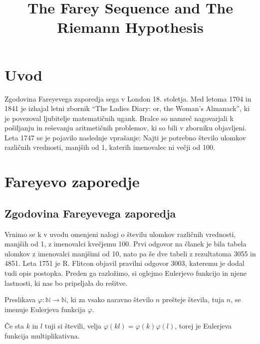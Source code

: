 \documentclass[mat1]{fmfdelo}
\title{The Farey Sequence and The Riemann Hypothesis}
\begin{document}
\section{Uvod}
Zgodovina Fareyevega zaporedja sega v London 18. stoletja. Med letoma 1704 in 1841 je izhajal letni zbornik ``The Ladies Diary: or, the Woman's Almanack'', ki je povezoval ljubitelje matematičnih ugank. Bralce so namreč nagovarjali k pošiljanju in reševanju aritmetičnih problemov, ki so bili v zborniku objavljeni. Leta 1747 se je pojavilo naslednje vprašanje: Najti je potrebno število ulomkov različnih vrednosti, manjših od 1, katerih imenovalec ni večji od 100.


\section{Fareyevo zaporedje}

\subsection{Zgodovina Fareyevega zaporedja}

Vrnimo se k v uvodu omenjeni nalogi o številu ulomkov različnih vrednosti, manjših od 1, z imenovalci kvečjemu 100. Prvi odgovor na članek je bila tabela ulomkov z imenovalci manjšimi od 10, nato pa še dve tabeli z rezultatoma 3055 in 4851. Leta 1751 je R. Flitcon objavil pravilni odgovor 3003, kateremu je dodal tudi opis postopka. Preden ga razložimo, si oglejmo Eulerjevo funkcijo in njene lastnosti, ki nas bo pripeljala do rešitve. 


\begin{definicija}
Preslikava \( \varphi \colon \mathbb{N} \rightarrow  \mathbb{N}\), ki za vsako naravno število $n$ prešteje števila, tuja $n$, se imenuje Eulerjeva funkcija $\varphi$.
\end{definicija}

\begin{trditev}
Če sta $k$ in $l$ tuji si števili, velja $\varphi (kl) = \varphi (k) \varphi (l)$, torej je Eulerjeva funkcija multiplikativna.
\end{trditev}
\end{document}
